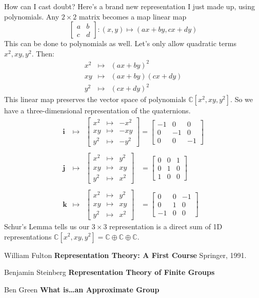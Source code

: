 \documentclass[12pt]{article}
\newcommand{\ii}{\mathbf{i}}
\newcommand{\jj}{\mathbf{j}}
\newcommand{\kk}{\mathbf{k}}
\begin{document}
How can I cast doubt?  Here's a brand new representation I just made up, using polynomials.  Any $2 \times 2$ matrix becomes a map linear map
$$ 
 \left[ \begin{array}{cc} a & b \\ c & d \end{array} \right] : (x,y) \mapsto (ax+by, cx+dy)  $$ 
This can be done to polynomials as well.  Let's only allow quadratic terms $x^2, xy, y^2$.  Then:
\begin{eqnarray*}
x^2 &\mapsto& (ax+by)^2 \\
xy  &\mapsto& (ax+by)(cx+dy) \\
y^2 &\mapsto& (cx+dy)^2
\end{eqnarray*}
This linear map preserves the vector space of polynomials $\mathbb{C}[x^2, xy, y^2]$.  So we have a three-dimensional representation of the quaternions.
\begin{eqnarray*} \ii &\mapsto& 
\left[\begin{array}{ccc}
x^2 &\mapsto& -x^2 \\
xy  &\mapsto& -xy \\
y^2 &\mapsto& -y^2
\end{array}\right] = \left[ \begin{array}{rrr} -1 & 0 & 0 \\ 0 & -1 & 0 \\ 0 & 0 & -1\end{array}\right] \\ \\
\jj &\mapsto& 
\left[\begin{array}{ccc}
x^2 &\mapsto& y^2 \\
xy  &\mapsto& xy \\
y^2 &\mapsto& x^2
\end{array}\right] \;\;\; = \left[ \begin{array}{rrr} 0 & 0 & 1 \\ 0 & 1 & 0 \\ 1 & 0 & 0\end{array}\right] \\ \\
\kk &\mapsto& 
\left[\begin{array}{ccc}
x^2 &\mapsto& y^2 \\
xy  &\mapsto& xy \\
y^2 &\mapsto& x^2
\end{array}\right] \;\;\; = \left[ \begin{array}{rrr} 0 & 0 & -1 \\ 0 & 1 & 0 \\ -1 & 0 & 0\end{array}\right]
\end{eqnarray*} 
Schur's Lemma tells us our $3 \times 3$ representation is a direct sum of 1D representations $\mathbb{C}[x^2, xy, y^2] = \mathbb{C} \oplus \mathbb{C} \oplus  \mathbb{C}$.
\vfill

\begin{thebibliography}{}

\item William Fulton \textbf{Representation Theory: A First Course} Springer, 1991.

\item Benjamin Steinberg \textbf{Representation Theory of Finite Groups} 

\item Ben Green \textbf{What is\dots an Approximate Group} 

\end{thebibliography}
\end{document}

